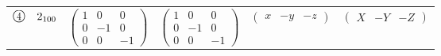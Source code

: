 \documentclass[fleqn,10pt,landscape]{jsarticle}
\begin{document}
\begin{center}
\begin{longtable}{lcccc}
$ {\ooalign{\hfil\resizebox{.8\width}{\height}{4}\hfil\crcr\raise.1ex\hbox{\large$\bigcirc$}}}\quad 2{}_{100} $ & $ \begin{pmatrix} 1 & 0 & 0 \\ 0 & -1 & 0 \\ 0 & 0 & -1 \end{pmatrix} $ & $ \begin{pmatrix} 1 & 0 & 0 \\ 0 & -1 & 0 \\ 0 & 0 & -1 \end{pmatrix} $ & $ \begin{pmatrix} x & - y & - z \end{pmatrix} $ & $ \begin{pmatrix} X & - Y & - Z \end{pmatrix} $ \\
\end{longtable}
\end{center}
\newpage
\end{document}

